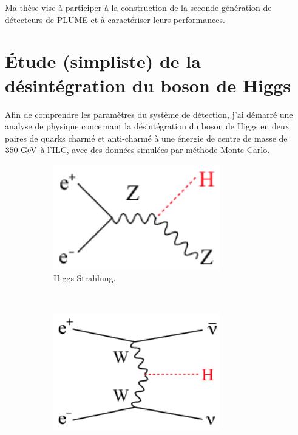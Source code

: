   Ma thèse vise à participer à la construction de la seconde génération de détecteurs de PLUME et à caractériser leurs performances.

  \section{Étude (simpliste) de la désintégration du boson de Higgs}

  Afin de comprendre les paramètres du système de détection, j'ai démarré une analyse de physique concernant la désintégration du boson de Higgs en deux paires de quarks charmé et anti-charmé à une énergie de centre de masse de $350~\rm{GeV}$ à l'ILC, avec des données simulées par méthode Monte Carlo.

    \begin{figure}  
        \centering
        \begin{subfigure}[t]{0.3\textwidth}
            \includegraphics[width = 0.8\textwidth]{Pictures/Higgs/Chapter_Theory_figs_ZHdiagram.png}
            \caption{Higgs-Strahlung.}
            \label{fig:higgsStrahlung}
        \end{subfigure}
        ~%
        \begin{subfigure}[t]{0.3\textwidth}
            \includegraphics[width = 0.8\textwidth]{Pictures/Higgs/Chapter_Theory_figs_nunuHdiagram.png}

\end{subfigure}
\end{figure}
